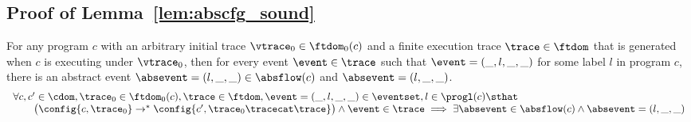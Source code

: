 
\subsection{Proof of Lemma~\ref{lem:abscfg_sound}}
\label{apdx:abscfg_sound}
\begin{lemma}
  For any program $c$ with 
  an arbitrary initial trace $\vtrace_0 \in \ftdom_0(c)$ and
  a finite execution trace $\trace \in \ftdom$ that is generated 
  when $c$ is executing under $\vtrace_0$,
  then for every event $\event \in \trace$ such that $\event = (\_, l, \_, \_)$ for some label $l$ in program $c$,
  there is an abstract event $\absevent = (l, \_, \_) \in \absflow(c)$ and $\absevent = (l, \_, \_)$.
%
\[
\begin{array}{l}
  \forall c, c' \in \cdom, \trace_0 \in \ftdom_0(c), \trace \in \ftdom ,  \event = (\_, l, \_, \_) \in \eventset, l \in \progl(c) \sthat
  \\
  \qquad
    \big(
    \config{{c}, \trace_0} \to^{*} \config{c', \trace_0 \tracecat \trace} 
  \big)
  \land \event \in \trace 
   \implies \exists 
  \absevent \in \absflow(c) \land \absevent = (l, \_, \_)
\end{array}
\]
\end{lemma}

